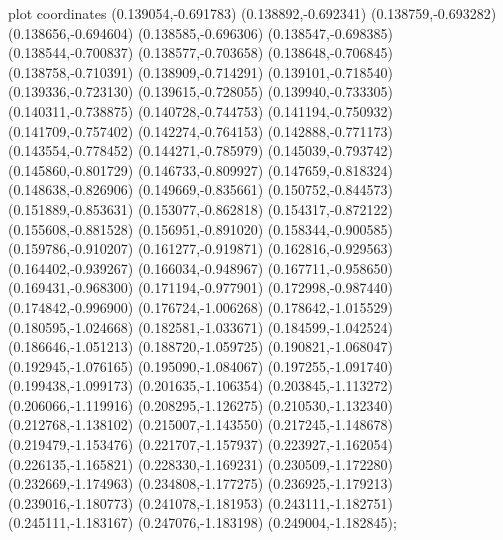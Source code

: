 { plot coordinates {(0.139054,-0.691783) (0.138892,-0.692341) (0.138759,-0.693282) (0.138656,-0.694604) (0.138585,-0.696306) (0.138547,-0.698385) (0.138544,-0.700837) (0.138577,-0.703658) (0.138648,-0.706845) (0.138758,-0.710391) (0.138909,-0.714291) (0.139101,-0.718540) (0.139336,-0.723130) (0.139615,-0.728055) (0.139940,-0.733305) (0.140311,-0.738875) (0.140728,-0.744753) (0.141194,-0.750932) (0.141709,-0.757402) (0.142274,-0.764153) (0.142888,-0.771173) (0.143554,-0.778452) (0.144271,-0.785979) (0.145039,-0.793742) (0.145860,-0.801729) (0.146733,-0.809927) (0.147659,-0.818324) (0.148638,-0.826906) (0.149669,-0.835661) (0.150752,-0.844573) (0.151889,-0.853631) (0.153077,-0.862818) (0.154317,-0.872122) (0.155608,-0.881528) (0.156951,-0.891020) (0.158344,-0.900585) (0.159786,-0.910207) (0.161277,-0.919871) (0.162816,-0.929563) (0.164402,-0.939267) (0.166034,-0.948967) (0.167711,-0.958650) (0.169431,-0.968300) (0.171194,-0.977901) (0.172998,-0.987440) (0.174842,-0.996900) (0.176724,-1.006268) (0.178642,-1.015529) (0.180595,-1.024668) (0.182581,-1.033671) (0.184599,-1.042524) (0.186646,-1.051213) (0.188720,-1.059725) (0.190821,-1.068047) (0.192945,-1.076165) (0.195090,-1.084067) (0.197255,-1.091740) (0.199438,-1.099173) (0.201635,-1.106354) (0.203845,-1.113272) (0.206066,-1.119916) (0.208295,-1.126275) (0.210530,-1.132340) (0.212768,-1.138102) (0.215007,-1.143550) (0.217245,-1.148678) (0.219479,-1.153476) (0.221707,-1.157937) (0.223927,-1.162054) (0.226135,-1.165821) (0.228330,-1.169231) (0.230509,-1.172280) (0.232669,-1.174963) (0.234808,-1.177275) (0.236925,-1.179213) (0.239016,-1.180773) (0.241078,-1.181953) (0.243111,-1.182751) (0.245111,-1.183167) (0.247076,-1.183198) (0.249004,-1.182845)};
}
